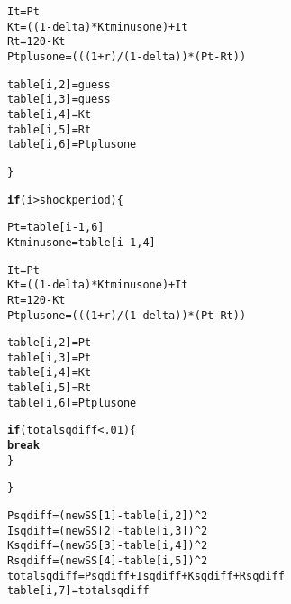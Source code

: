 \documentclass{article}\usepackage[]{graphicx}\usepackage[]{color}
\makeatletter
\newcommand{\hlnum}[1]{\textcolor[rgb]{0.686,0.059,0.569}{#1}}%
\newcommand{\hlopt}[1]{\textcolor[rgb]{0,0,0}{#1}}%
\newcommand{\hlstd}[1]{\textcolor[rgb]{0.345,0.345,0.345}{#1}}%
\newcommand{\hlkwa}[1]{\textcolor[rgb]{0.161,0.373,0.58}{\textbf{#1}}}%
\newcommand{\hlkwb}[1]{\textcolor[rgb]{0.69,0.353,0.396}{#1}}%
\newenvironment{kframe}{%
 \def\at@end@of@kframe{}%
 \ifinner\ifhmode%
  \def\at@end@of@kframe{\end{minipage}}%
  \begin{minipage}{\columnwidth}%
 \fi\fi%
 \def\FrameCommand##1{\hskip\@totalleftmargin \hskip-\fboxsep
 \colorbox{shadecolor}{##1}\hskip-\fboxsep
     \hskip-\linewidth \hskip-\@totalleftmargin \hskip\columnwidth}%
 \MakeFramed {\advance\hsize-\width
   \@totalleftmargin\z@ \linewidth\hsize
   \@setminipage}}%
 {\par\unskip\endMakeFramed%
 \at@end@of@kframe}
\newenvironment{knitrout}{}{} %
\makeatother
\begin{document}
\begin{knitrout}
\begin{kframe}
\begin{alltt}
        \hlstd{It} \hlkwb{=} \hlstd{Pt}
        \hlstd{Kt} \hlkwb{=} \hlstd{((}\hlnum{1} \hlopt{-} \hlstd{delta)} \hlopt{*} \hlstd{Ktminusone)} \hlopt{+} \hlstd{It}
        \hlstd{Rt} \hlkwb{=} \hlnum{120} \hlopt{-} \hlstd{Kt}
        \hlstd{Ptplusone} \hlkwb{=} \hlstd{(((}\hlnum{1} \hlopt{+} \hlstd{r)} \hlopt{/} \hlstd{(}\hlnum{1} \hlopt{-} \hlstd{delta))} \hlopt{*} \hlstd{(Pt} \hlopt{-} \hlstd{Rt))}

        \hlstd{table[i,}\hlnum{2}\hlstd{]} \hlkwb{=} \hlstd{guess}
        \hlstd{table[i,}\hlnum{3}\hlstd{]} \hlkwb{=} \hlstd{guess}
        \hlstd{table[i,}\hlnum{4}\hlstd{]} \hlkwb{=} \hlstd{Kt}
        \hlstd{table[i,} \hlnum{5}\hlstd{]} \hlkwb{=} \hlstd{Rt}
        \hlstd{table[i,} \hlnum{6}\hlstd{]} \hlkwb{=} \hlstd{Ptplusone}

      \hlstd{\}}

      \hlkwa{if} \hlstd{(i} \hlopt{>} \hlstd{shockperiod)\{}

        \hlstd{Pt} \hlkwb{=} \hlstd{table[i}\hlopt{-}\hlnum{1}\hlstd{,} \hlnum{6}\hlstd{]}
        \hlstd{Ktminusone} \hlkwb{=} \hlstd{table[i}\hlopt{-}\hlnum{1}\hlstd{,}\hlnum{4}\hlstd{]}

        \hlstd{It} \hlkwb{=} \hlstd{Pt}
        \hlstd{Kt} \hlkwb{=} \hlstd{((}\hlnum{1} \hlopt{-} \hlstd{delta)} \hlopt{*} \hlstd{Ktminusone)} \hlopt{+} \hlstd{It}
        \hlstd{Rt} \hlkwb{=} \hlnum{120} \hlopt{-} \hlstd{Kt}
        \hlstd{Ptplusone} \hlkwb{=} \hlstd{(((}\hlnum{1} \hlopt{+} \hlstd{r)} \hlopt{/} \hlstd{(}\hlnum{1} \hlopt{-} \hlstd{delta))} \hlopt{*} \hlstd{(Pt} \hlopt{-} \hlstd{Rt))}

        \hlstd{table[i,}\hlnum{2}\hlstd{]} \hlkwb{=} \hlstd{Pt}
        \hlstd{table[i,}\hlnum{3}\hlstd{]} \hlkwb{=} \hlstd{Pt}
        \hlstd{table[i,}\hlnum{4}\hlstd{]} \hlkwb{=} \hlstd{Kt}
        \hlstd{table[i,} \hlnum{5}\hlstd{]} \hlkwb{=} \hlstd{Rt}
        \hlstd{table[i,} \hlnum{6}\hlstd{]} \hlkwb{=} \hlstd{Ptplusone}

        \hlkwa{if}\hlstd{(totalsqdiff} \hlopt{<} \hlnum{.01}\hlstd{)\{}
          \hlkwa{break}
        \hlstd{\}}

      \hlstd{\}}

      \hlstd{Psqdiff} \hlkwb{=} \hlstd{(newSS[}\hlnum{1}\hlstd{]} \hlopt{-} \hlstd{table[i,}\hlnum{2}\hlstd{])}\hlopt{^}\hlnum{2}
      \hlstd{Isqdiff} \hlkwb{=} \hlstd{(newSS[}\hlnum{2}\hlstd{]} \hlopt{-} \hlstd{table[i,}\hlnum{3}\hlstd{])}\hlopt{^}\hlnum{2}
      \hlstd{Ksqdiff} \hlkwb{=} \hlstd{(newSS[}\hlnum{3}\hlstd{]} \hlopt{-} \hlstd{table[i,}\hlnum{4}\hlstd{])}\hlopt{^}\hlnum{2}
      \hlstd{Rsqdiff} \hlkwb{=} \hlstd{(newSS[}\hlnum{4}\hlstd{]} \hlopt{-} \hlstd{table[i,}\hlnum{5}\hlstd{])}\hlopt{^}\hlnum{2}
      \hlstd{totalsqdiff} \hlkwb{=} \hlstd{Psqdiff} \hlopt{+} \hlstd{Isqdiff} \hlopt{+} \hlstd{Ksqdiff} \hlopt{+} \hlstd{Rsqdiff}
      \hlstd{table[i,}\hlnum{7}\hlstd{]}  \hlkwb{=} \hlstd{totalsqdiff}


\end{alltt}
\end{kframe}
\end{knitrout}
\end{document}
